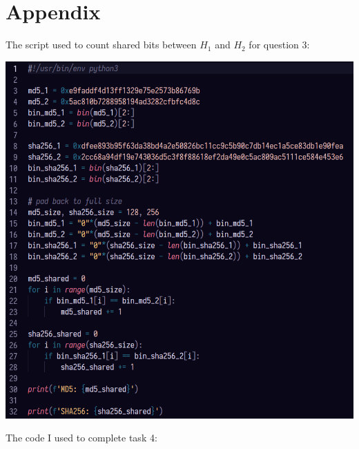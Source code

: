 \documentclass[12pt,largemargins]{homework}
\begin{document}
\section*{Appendix}
The script used to count shared bits between $H_1$ and $H_2$ for question 3:
\begin{center}
    \includegraphics[width=.75\textwidth]{count-shared-bits-py.png}
\end{center}
\clearpage
The code I used to complete task 4:
\end{document}
